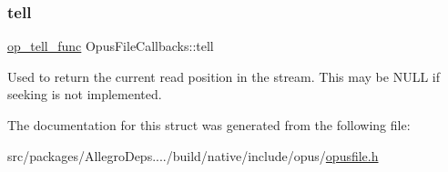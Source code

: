 \subsubsection{\texorpdfstring{tell}{tell}}
{\footnotesize\ttfamily \hyperlink{group__stream__callbacks_gaca012812dea4bc3a27b0c23575efecaf}{op\+\_\+tell\+\_\+func} Opus\+File\+Callbacks\+::tell}

Used to return the current read position in the stream. This may be {\ttfamily N\+U\+LL} if seeking is not implemented. 

The documentation for this struct was generated from the following file\+:\begin{DoxyCompactItemize}
\item 
src/packages/\+Allegro\+Deps..../build/native/include/opus/\hyperlink{opusfile_8h}{opusfile.\+h}\end{DoxyCompactItemize}
